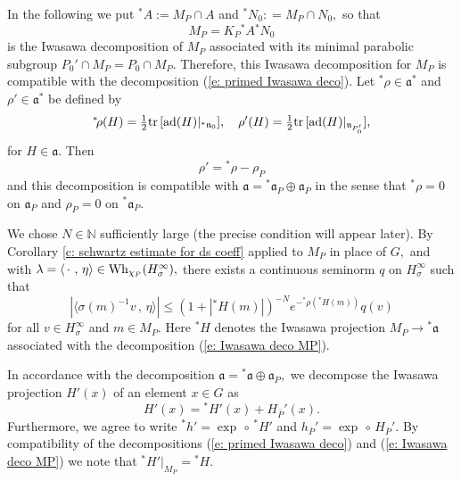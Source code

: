 \documentclass[12pt,a4paper]{article}
\def\msy#1{{\mathbb #1}}
\def\N{{\msy N}}
\def\gl{\lambda}
\def\gs{\sigma}
\def\got#1{\mathfrak #1}
\def\fa{{\got a}}
\def\fn{{\got n}}
\def\to{\rightarrow}
\def\inp#1#2{\langle#1\,,\,#2\rangle}
\def\ad{{\rm ad}}
\def\after{\,{\scriptstyle\circ}\,}
\def\tr{{\rm tr}\,}
\numberwithin{Thm}{section}
\numberwithin{equation}{section}
\def\dotvar{\, \cdot\,}
\def\Wh{{\rm Wh}}
\numberwithin{equation}{section}
\def\half{{\textstyle \frac12}}
\def\cchi{\chi}
\begin{document}
In the following we put ${}^*\!A:= M_P\cap A$ and ${}^*\!N_0: = M_P \cap N_0,$ 
so that 
\begin{equation}
\label{e: Iwasawa deco MP}
M_P = K_P {}^*\!A {}^*\!N_0 
\end{equation}
 is the Iwasawa decomposition of $M_P$ 
associated with its minimal parabolic subgroup $P_0' \cap M_P = P_0 \cap M_P.$ 
Therefore, this Iwasawa decomposition for $M_P$ is compatible with the decomposition
(\ref{e: primed Iwasawa deco}). 
Let ${}^*\!\rho \in \fa^*$ and $\rho' \in \fa^*$ 
be defined by 
$$ 
{}^*\!\rho (H) = \half \tr [\ad(H)|_{{}^*\fn_0}],\quad \rho'(H) = \half \tr [\ad(H)|_{\fn_{P_0'}}],
$$%
for  $H \in \fa.$ Then 
\begin{equation}
\label{e: deco rho prime}
\rho' = {}^* \rho -  \rho_P
\end{equation}
and this decomposition is compatible with $\fa = {}^* \fa_P \oplus \fa_P$ in the sense that
${}^*\rho = 0$ on $\fa_P$ and $\rho_P = 0$ on ${}^*\fa_P.$ 

We chose $N \in \N$ sufficiently large (the precise condition will appear later). 
By Corollary \ref{c: schwartz estimate for ds coeff} applied to $M_P$ in place of $G,$ 
and with $\gl = \inp{\dotvar}{\eta} \in \Wh_{\cchi_P}(H_\gs^\infty),$ 
 there exists a continuous seminorm $q$ on $H_\gs^{\infty}$ such that
\begin{equation}
\label{e: estimate coeff MP} 
|\inp{\gs(m)^{-1}v}{\eta}| \leq ( 1 + |{}^*H(m) |)^{-N} e^{-{}^*\!\rho({}^*H(m))} q(v)
\end{equation}
for all $v \in H_\gs^{\infty}$ and  $m \in M_P.$ Here ${}^*H$ denotes
the Iwasawa projection $M_P \to {}^*\fa$ associated with the decomposition (\ref{e: Iwasawa deco MP}).

In accordance with the decomposition $\fa = {}^* \fa \oplus \fa_{P},$  we decompose the Iwasawa
projection $H'(x)$ of an element $x \in G$ as 
\begin{equation} 
\label{e: deco H prime}
H'(x) = {}^*H'(x) +  H_{\bar P}'(x).
\end{equation}
Furthermore, we agree to write ${}^*h' = \exp \after {}^*H'$ and $h_{\bar P}' = \exp \after H_{\bar P}'.$ 
By compatibility of the decompositions (\ref{e: primed Iwasawa deco}) 
and (\ref{e: Iwasawa deco MP}) we note that  ${}^*H' |_{M_P} = {}^*H.$ 
\end{document}
